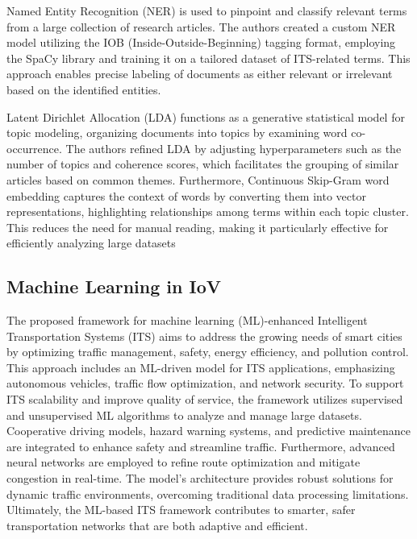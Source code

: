 \documentclass[12pt,twocolumn]{article}
\begin{document}
Named Entity Recognition (NER) is used to pinpoint and classify relevant terms from a large collection of research articles. The authors created a custom NER model utilizing the IOB (Inside-Outside-Beginning) tagging format, employing the SpaCy library and training it on a tailored dataset of ITS-related terms. This approach enables precise labeling of documents as either relevant or irrelevant based on the identified entities.

Latent Dirichlet Allocation (LDA) functions as a generative statistical model for topic modeling, organizing documents into topics by examining word co-occurrence. The authors refined LDA by adjusting hyperparameters such as the number of topics and coherence scores, which facilitates the grouping of similar articles based on common themes. Furthermore, Continuous Skip-Gram word embedding captures the context of words by converting them into vector representations, highlighting relationships among terms within each topic cluster. This reduces the need for manual reading, making it particularly effective for efficiently analyzing large datasets

\subsection{Machine Learning in IoV}

The proposed framework for machine learning (ML)-enhanced Intelligent Transportation Systems (ITS) aims to address the growing needs of smart cities by optimizing traffic management, safety, energy efficiency, and pollution control. This approach includes an ML-driven model for ITS applications, emphasizing autonomous vehicles, traffic flow optimization, and network security.
To support ITS scalability and improve quality of service, the framework utilizes supervised and unsupervised ML algorithms to analyze and manage large datasets. Cooperative driving models, hazard warning systems, and predictive maintenance are integrated to enhance safety and streamline traffic. Furthermore, advanced neural networks are employed to refine route optimization and mitigate congestion in real-time. The model’s architecture provides robust solutions for dynamic traffic environments, overcoming traditional data processing limitations. Ultimately, the ML-based ITS framework contributes to smarter, safer transportation networks that are both adaptive and efficient.
\end{document}
